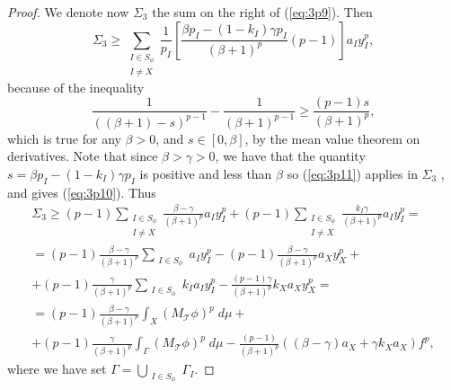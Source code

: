 \documentclass{article}
\numberwithin{equation}{section}
\theoremstyle{definition}
\theoremstyle{remark}
\newcommand{\mc}[1]{\mathcal{#1}}
\begin{document}
\begin{proof}
We denote now $\Sigma_3$ the sum on the right of (\ref{eq:3p9}).
Then
\begin{equation}\label{eq:3p10}
\Sigma_3 \geq \sum_{\substack{I\in S_\phi \\ I\neq X}} \frac{1}{p_I}\left[ \frac{\beta p_I-(1-k_I)\gamma p_I}{(\beta +1)^p} (p-1) \right]a_I y_I^p,
\end{equation}
because of the inequality
\begin{equation}\label{eq:3p11}
\frac{1}{\left( (\beta +1)-s \right)^{p-1}}-\frac{1}{(\beta +1)^{p-1}}\geq\frac{(p-1)s}{(\beta +1)^p},
\end{equation}
which is true for any $\beta>0$, and $s\in[0,\beta]$, by the mean value theorem on derivatives. Note that since $\beta>\gamma>0$, we have that the quantity $s=\beta p_I-(1-k_I)\gamma p_I$ is positive and less than $\beta$ so (\ref{eq:3p11}) applies in $\Sigma_3$ , and gives (\ref{eq:3p10}). Thus
\begin{multline} \label{eq:3p12}
\Sigma_3\geq (p-1)\sum_{\substack{I\in S_\phi \\ I\neq X}} \frac{\beta -\gamma}{(\beta +1)^{p}}a_I y_I^p+ (p-1)\sum_{\substack{I\in S_\phi \\ I\neq X}}\frac{k_I \gamma}{(\beta+1)^p}a_I y_I^p=\\
=(p-1)\frac{\beta-\gamma}{(\beta +1)^p}\sum_{\substack{I\in S_\phi }}a_I y_I^p -(p-1)\frac{\beta- \gamma}{(\beta +1)^p}a_Xy_X^p+\\
+ (p-1)\frac{\gamma}{(\beta +1)^p}\sum_{\substack{I\in S_\phi }}k_I a_I y_I^p-\frac{(p-1)\gamma}{(\beta +1)^p} k_Xa_X y_X^p=\\
=(p-1)\frac{\beta-\gamma}{(\beta +1)^p}\int_X \left(M_{\mc T}\phi \right)^p\; d\mu +\\
+ (p-1)\frac{\gamma}{(\beta +1)^p}\int_{\Gamma} \left(M_{\mc T}\phi \right)^p\; d\mu-\frac{(p-1)}{(\beta +1)^p} \left( (\beta-\gamma)a_X+\gamma k_X a_X \right) f^p,
\end{multline}
where we have set $\Gamma=\bigcup_{\substack{I\in S_\phi}} \Gamma_I$.


\end{proof}
\end{document}
